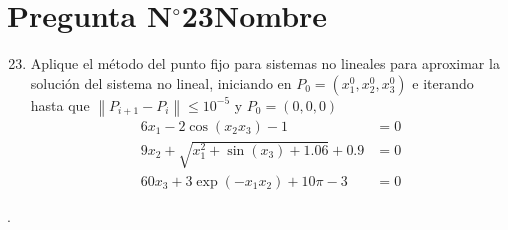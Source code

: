 \section{Pregunta N$^{\circ}$23\qquad Nombre}

\begin{frame}
	\begin{enumerate}\setcounter{enumi}{22}
		\item

		      Aplique el método del punto fijo para sistemas no lineales
		      para aproximar la solución del sistema no lineal, iniciando
		      en
		      \begin{math}
			      P_{0}=
			      \left(
			      x^{0}_{1},x^{0}_{2},x^{0}_{3}
			      \right)
		      \end{math}
		      e iterando hasta que
		      \begin{math}
			      \left\|
			      P_{i+1}-
			      P_{i}\right\|
			      \leq 10^{-5}
		      \end{math}
		      y $P_{0}=\left(0,0,0\right)$
		      \begin{align*}
			      6x_{1}-2\cos\left(x_{2}x_{3}\right)-1                   & =0 \\
			      9x_{2}+\sqrt{x^{2}_{1}+\sin\left(x_{3}\right)+1.06}+0.9 & =0 \\
			      60x_{3}+3\exp\left(-x_{1}x_{2}\right)+10 \pi-3          & =0
		      \end{align*}

	\end{enumerate}

	\begin{solution}
		.
	\end{solution}
\end{frame}